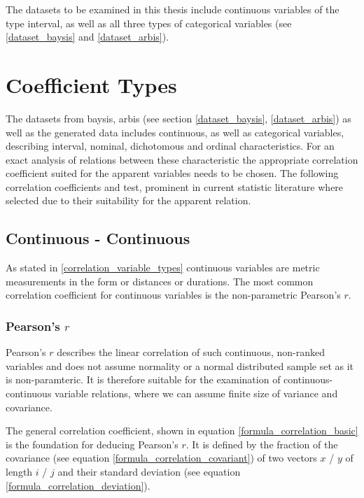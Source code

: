 \documentclass[a4paper,12pt]{report}
\begin{document}
The datasets to be examined in this thesis include continuous variables of the type interval, as well as all three types of categorical variables (see \ref{dataset_baysis} and \ref{dataset_arbis}).

\section{Coefficient Types}
\label{correlation_coefficient_types}
The datasets from \acrshort{baysis}, \acrshort{arbis} (see section \ref{dataset_baysis}, \ref{dataset_arbis}) as well as the generated data includes continuous, as well as categorical variables, describing interval, nominal, dichotomous and ordinal characteristics. For an exact analysis of relations between these characteristic the appropriate correlation coefficient suited for the apparent variables needs to be chosen. The following correlation coefficients and test, prominent in current statistic literature where selected due to their suitability for the apparent relation.

\subsection{Continuous - Continuous}
\label{correlation_pearson}

As stated in \ref{correlation_variable_types} continuous variables are metric measurements in the form or distances or durations. The most common correlation coefficient for continuous variables is the non-parametric Pearson's $r$.

\subsubsection{Pearson's $r$}


Pearson's $r$ describes the linear correlation of such continuous, non-ranked variables and does not assume normality or a normal distributed sample set as it is non-paramteric. It is therefore suitable for the examination of continuous-continuous variable relations, where we can assume finite size of variance and covariance. \cite{BenestyChenHuang2009,Sulthan2018}
 
The general correlation coefficient, shown in equation \ref{formula_correlation_basic} is the foundation for deducing Pearson's $r$. It is defined by the fraction of the covariance (see equation \ref{formula_correlation_covariant}) of two vectors $x$ / $y$ of length $i$ / $j$ and their standard deviation (see equation \ref{formula_correlation_deviation}).\cite{HerzSchlicherSiegener1992}
\end{document}

